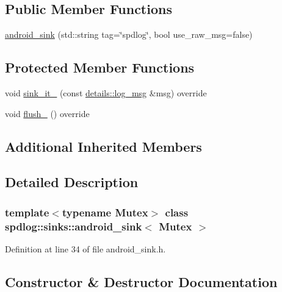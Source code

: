 \subsection*{Public Member Functions}
\begin{DoxyCompactItemize}
\item 
\hyperlink{classspdlog_1_1sinks_1_1android__sink_afc2727bf62737809cd3f2105e5637540}{android\+\_\+sink} (std\+::string tag=\char`\"{}spdlog\char`\"{}, bool use\+\_\+raw\+\_\+msg=false)
\end{DoxyCompactItemize}
\subsection*{Protected Member Functions}
\begin{DoxyCompactItemize}
\item 
void \hyperlink{classspdlog_1_1sinks_1_1android__sink_ab91c7aabd013d009ff811e6d34324128}{sink\+\_\+it\+\_\+} (const \hyperlink{structspdlog_1_1details_1_1log__msg}{details\+::log\+\_\+msg} \&msg) override
\item 
void \hyperlink{classspdlog_1_1sinks_1_1android__sink_ac71785899fb01c7b0328b66b3727e2c3}{flush\+\_\+} () override
\end{DoxyCompactItemize}
\subsection*{Additional Inherited Members}


\subsection{Detailed Description}
\subsubsection*{template$<$typename Mutex$>$\newline
class spdlog\+::sinks\+::android\+\_\+sink$<$ Mutex $>$}



Definition at line 34 of file android\+\_\+sink.\+h.



\subsection{Constructor \& Destructor Documentation}
\mbox{\label{classspdlog_1_1sinks_1_1android__sink_afc2727bf62737809cd3f2105e5637540}} 
